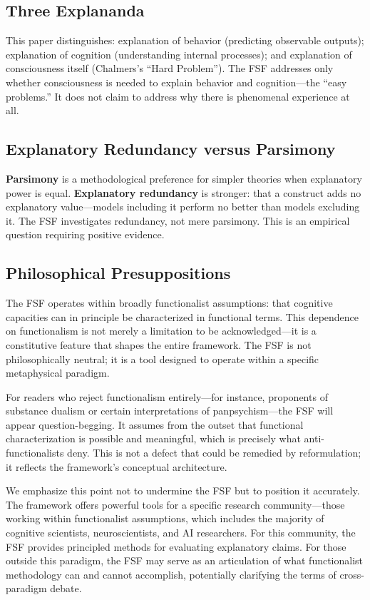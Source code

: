 \documentclass[12pt,a4paper]{article}
\begin{document}
\subsection{Three Explananda}

This paper distinguishes: explanation of behavior (predicting observable outputs); explanation of cognition (understanding internal processes); and explanation of consciousness itself (Chalmers's ``Hard Problem''). The FSF addresses only whether consciousness is needed to explain behavior and cognition---the ``easy problems.'' It does not claim to address why there is phenomenal experience at all.

\subsection{Explanatory Redundancy versus Parsimony}

\textbf{Parsimony} is a methodological preference for simpler theories when explanatory power is equal. \textbf{Explanatory redundancy} is stronger: that a construct adds no explanatory value---models including it perform no better than models excluding it. The FSF investigates redundancy, not mere parsimony. This is an empirical question requiring positive evidence.

\subsection{Philosophical Presuppositions}

The FSF operates within broadly functionalist assumptions: that cognitive capacities can in principle be characterized in functional terms. This dependence on functionalism is not merely a limitation to be acknowledged---it is a constitutive feature that shapes the entire framework. The FSF is not philosophically neutral; it is a tool designed to operate within a specific metaphysical paradigm.

For readers who reject functionalism entirely---for instance, proponents of substance dualism or certain interpretations of panpsychism---the FSF will appear question-begging. It assumes from the outset that functional characterization is possible and meaningful, which is precisely what anti-functionalists deny. This is not a defect that could be remedied by reformulation; it reflects the framework's conceptual architecture.

We emphasize this point not to undermine the FSF but to position it accurately. The framework offers powerful tools for a specific research community---those working within functionalist assumptions, which includes the majority of cognitive scientists, neuroscientists, and AI researchers. For this community, the FSF provides principled methods for evaluating explanatory claims. For those outside this paradigm, the FSF may serve as an articulation of what functionalist methodology can and cannot accomplish, potentially clarifying the terms of cross-paradigm debate.
\end{document}
